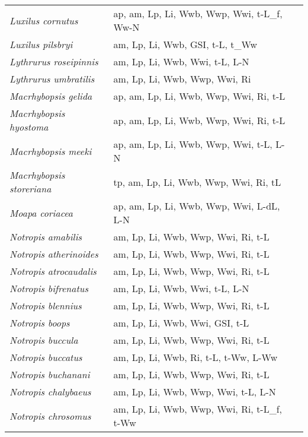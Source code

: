 {\begin{longtable}[c]{p{3.5cm}p{5.5cm}p{5.5cm}}
\emph{Luxilus cornutus} &  ap, am, Lp, Li, Wwb, Wwp, Wwi, t-L\_f, Ww-N & \citet{Cobu1986,Fee1965} \\
\emph{Luxilus pilsbryi} &  am, Lp, Li, Wwb, GSI, t-L, t\_Ww & \citet{Cobu1986,SimmBeck2012} \\
\emph{Lythrurus roseipinnis} &  am, Lp, Li, Wwb, Wwi, t-L, L-N & \citet{HeinBres1975} \\
\emph{Lythrurus umbratilis} &  am, Lp, Li, Wwb, Wwp, Wwi, Ri & \citet{Cobu1986} \\
\emph{Macrhybopsis gelida} &  ap, am, Lp, Li, Wwb, Wwp, Wwi, Ri, t-L & \citet{DietRobe2006,StarMill2016} \\
\emph{Macrhybopsis hyostoma} &  ap, am, Lp, Li, Wwb, Wwp, Wwi, Ri, t-L & \citet{DietRobe2006,ScopBurg1992,StarMill2016} \\
\emph{Macrhybopsis meeki} &  ap, am, Lp, Li, Wwb, Wwp, Wwi, t-L, L-N & \citet{DietRobe2006,StarMill2016} \\
\emph{Macrhybopsis storeriana} &  tp, am, Lp, Li, Wwb, Wwp, Wwi, Ri, tL & \citet{DietRobe2006} \\
\emph{Moapa coriacea} &  ap, am, Lp, Li, Wwb, Wwp, Wwi, L-dL, L-N & \citet{ScopBurg1992,Here2014} \\
\emph{Notropis amabilis} &  am, Lp, Li, Wwb, Wwp, Wwi, Ri, t-L & \citet{Cobu1986} \\
\emph{Notropis atherinoides} &  am, Lp, Li, Wwb, Wwp, Wwi, Ri, t-L & \citet{Cobu1986,Fuch1967} \\
\emph{Notropis atrocaudalis} &  am, Lp, Li, Wwb, Wwp, Wwi, Ri, t-L & \citet{Cobu1986} \\
\emph{Notropis bifrenatus} &  am, Lp, Li, Wwb, Wwi, t-L, L-N & \citet{Harr1948} \\
\emph{Notropis blennius} &  am, Lp, Li, Wwb, Wwp, Wwi, Ri, t-L & \citet{Cobu1986} \\
\emph{Notropis boops} &  am, Lp, Li, Wwb, Wwi, GSI, t-L & \citet{LehtEche1979} \\
\emph{Notropis buccula} &  am, Lp, Li, Wwb, Wwp, Wwi, Ri, t-L & \citet{Mark1999} \\
\emph{Notropis buccatus} &  am, Lp, Li, Wwb, Ri, t-L, t-Ww, L-Ww & \citet{Hoyt1971} \\
\emph{Notropis buchanani} &  am, Lp, Li, Wwb, Wwp, Wwi, Ri, t-L & \citet{Cobu1986} \\
\emph{Notropis chalybaeus} &  am, Lp, Li, Wwb, Wwp, Wwi, t-L, L-N & \citet{PerkShat2012} \\
\emph{Notropis chrosomus} &  am, Lp, Li, Wwb, Wwp, Wwi, Ri, t-L\_f, t-Ww & \citet{HoldPowe2010} \\

\end{longtable}}
